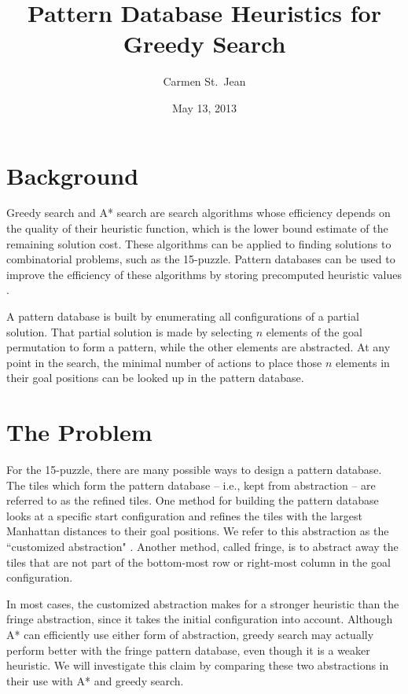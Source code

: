 \documentclass[letterpaper]{article}
\begin{document}
\title{Pattern Database Heuristics for Greedy Search}
\date{May 13, 2013}
\author{Carmen St.\ Jean}

\nocopyright{\gdef\copyright@on{}}

\maketitle

\section{Background}

Greedy search and A* search are search algorithms whose efficiency depends on the quality of their heuristic function, which is the lower bound estimate of the remaining solution cost.  These algorithms can be applied to finding solutions to combinatorial problems, such as the 15-puzzle.  Pattern databases can be used to improve the efficiency of these algorithms by storing precomputed heuristic values \cite{DBLP:journals/ci/CulbersonS98}.

A pattern database is built by enumerating all configurations of a partial solution.  That partial solution is made by selecting $n$ elements of the goal permutation to form a pattern, while the other elements are abstracted.  At any point in the search, the minimal number of actions to place those $n$ elements in their goal positions can be looked up in the pattern database.

\section{The Problem}

For the 15-puzzle, there are many possible ways to design a pattern database.  The tiles which form the pattern database -- i.e., kept from abstraction -- are referred to as the refined tiles.  One method for building the pattern database looks at a specific start configuration and refines the tiles with the largest Manhattan distances to their goal positions.  We refer to this abstraction as the ``customized abstraction" \cite{DBLP:conf/sara/HolteGT05}. Another method, called fringe, is to abstract away the tiles that are not part of the bottom-most row or right-most column in the goal configuration.

In most cases, the customized abstraction makes for a stronger heuristic than the fringe abstraction, since it takes the initial configuration into account.  Although A* can efficiently use either form of abstraction, greedy search may actually perform better with the fringe pattern database, even though it is a weaker heuristic.  We will investigate this claim by comparing these two abstractions in their use with A* and greedy search. 
\end{document}
